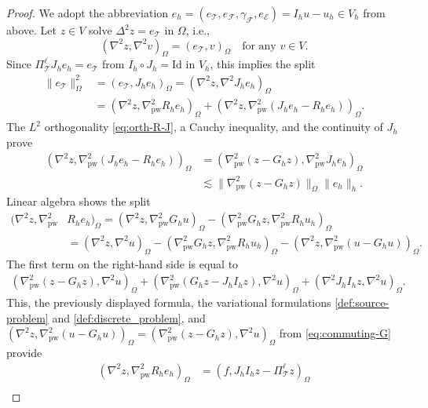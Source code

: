 \documentclass[a4paper]{amsart}
\numberwithin{equation}{section}
\def\F{\mathcal{F}}
\def\E{\mathcal{E}}
\def\T{\mathcal{T}}
\def\pw{\mathrm{pw}}
\theoremstyle{definition}
\theoremstyle{remark}
\numberwithin{theorem}{section}
\numberwithin{equation}{section}
\numberwithin{table}{section}
\numberwithin{figure}{section}
\begin{document}
\begin{proof}
    We adopt the abbreviation $e_h = (e_\T, e_\F, \gamma_\F, e_\E) = I_h u - u_h \in V_h$ from above. Let $z\in V$ solve $\Delta^2 z = e_{\mathcal{T}}$ in $\Omega$, i.e.,
    \begin{equation*}
    	(\nabla^2 z,\nabla^2v)_{\Omega} = (e_\T, v)_{\Omega} \quad \text{for any } v \in V.
    \end{equation*}
    Since $\Pi_\T^\ell J_h e_h = e_\T$ from $I_h \circ J_h = \mathrm{Id}$ in $V_h$, this implies the split
    \begin{align}\label{eq:proof-L2-split}
    	\|e_\T\|_\Omega^2 &= (e_\T, J_h e_h)_{\Omega} = (\nabla^2 z,\nabla^2 J_h e_h)_{\Omega}\nonumber\\
    	& = (\nabla^2 z,\nabla^2_\pw R_h e_h)_{\Omega} + (\nabla^2 z, \nabla^2_\pw (J_h e_h - R_h e_h))_{\Omega}.
    \end{align}
    The $L^2$ orthogonality \eqref{eq:orth-R-J}, a Cauchy inequality, and the continuity of $J_h$ prove
    \begin{align}\label{ineq:proof-L2-1}
    	(\nabla^2 z, \nabla^2_\pw (J_h e_h - R_h e_h))_{\Omega} & = (\nabla^2_\pw (z- G_h z),\nabla^2_\pw J_h e_h)_{\Omega}\nonumber\\
    	&\lesssim \|\nabla^2_\pw (z - G_h z)\|_\Omega \|e_h\|_h.
    \end{align}
    Linear algebra shows the split
    \begin{align*}
    	(\nabla^2 z,\nabla^2_\pw &R_h e_h)_{\Omega} = (\nabla^2 z, \nabla^2_\pw G_h u)_\Omega - (\nabla^2_\pw G_h z, \nabla^2_\pw R_h u_h)_\Omega\\
    	&= (\nabla^2 z, \nabla^2 u)_\Omega - (\nabla^2_\pw G_h z, \nabla^2_\pw R_h u_h)_\Omega - (\nabla^2 z, \nabla^2_\pw(u - G_h u))_\Omega.
    \end{align*}
    The first term on the right-hand side is equal to
    \begin{align*}
    	 (\nabla^2_\pw(z - G_h z), \nabla^2 u)_\Omega + (\nabla_\pw^2(G_h z - J_h I_h z), \nabla^2 u)_\Omega + (\nabla^2 J_h I_h z, \nabla^2 u)_\Omega.
    \end{align*}
    This, the previously displayed formula, the variational formulations \eqref{def:source-problem} and \eqref{def:discrete_problem}, and $(\nabla^2 z, \nabla^2_\pw(u - G_h u))_\Omega = (\nabla^2_\pw(z - G_h z), \nabla^2 u)_\Omega$ from \eqref{eq:commuting-G} provide
    \begin{align}\label{eq:proof-L2-identity}
    	(\nabla^2 z,\nabla^2_\pw R_h e_h)_{\Omega} &= (f, J_h I_h z - \Pi_\T^\ell z)_\Omega\nonumber\\

\end{align}
\end{proof}
\end{document}
